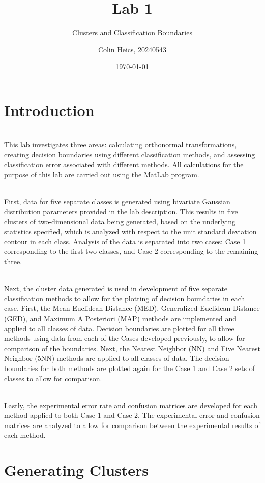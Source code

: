 \documentclass[article, 1.5space, letterpaper, 12pt, oneside, header, footer]{SydeClass}
\title{Lab 1}
\subtitle{Clusters and Classification Boundaries}
\author{Colin Heics, 20240543}
\date{\today}
\begin{document}




\section{Introduction}
\\This lab investigates three areas: calculating orthonormal transformations, creating decision boundaries using different classification methods, and assessing classification error associated with different methods. All calculations for the purpose of this lab are carried out using the MatLab program.

\\First, data for five separate classes is generated using bivariate Gaussian distribution parameters provided in the lab description. This results in five clusters of two-dimensional data being generated, based on the underlying statistics specified, which is analyzed with respect to the unit standard deviation contour in each class. Analysis of the data is separated into two cases: Case 1 corresponding to the first two classes, and Case 2 corresponding to the remaining three.

\\Next, the cluster data generated is used in development of five separate classification methods to allow for the plotting of decision boundaries in each case. First, the Mean Euclidean Distance (MED), Generalized Euclidean Distance (GED), and Maximum A Posteriori (MAP) methods are implemented and applied to all classes of data. Decision boundaries are plotted for all three methods using data from each of the Cases developed previously, to allow for comparison of the boundaries. Next, the Nearest Neighbor (NN) and Five Nearest Neighbor (5NN) methods are applied to all classes of data. The decision boundaries for both methods are plotted again for the Case 1 and Case 2 sets of classes to allow for comparison.

\\Lastly, the experimental error rate and confusion matrices are developed for each method applied to both Case 1 and Case 2. The experimental error and confusion matrices are analyzed to allow for comparison between the experimental results of each method.

\section{Generating Clusters}
\end{document}
